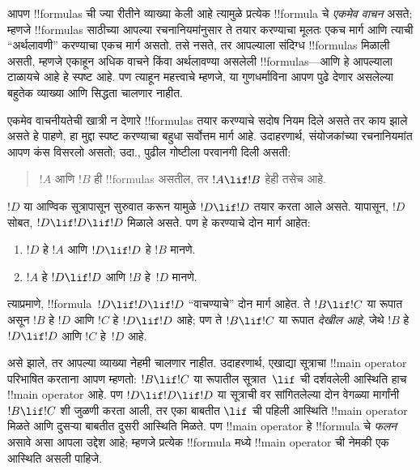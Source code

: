 \documentclass[../../../include/open-logic-section]{subfiles}
\begin{document}


\begin{explain}
आपण !!{formula}s ची ज्या रीतीने व्याख्या केली आहे त्यामुळे प्रत्येक
!!{formula} चे \emph{एकमेव वाचन} असते; म्हणजे !!{formula}s साठीच्या
आपल्या रचनानियमांनुसार ते तयार करण्याचा मूलतः एकच मार्ग आणि त्याची
``अर्थलावणी'' करण्याचा एकच मार्ग असतो. तसे नसते, तर आपल्याला संदिग्ध
!!{formula}s मिळाली असती, म्हणजे एकाहून अधिक वाचने किंवा अर्थलावण्या
असलेली !!{formula}s---आणि हे आपल्याला टाळायचे आहे हे स्पष्ट आहे. पण
त्याहून महत्त्वाचे म्हणजे, या गुणधर्माविना आपण पुढे देणार असलेल्या
बहुतेक व्याख्या आणि सिद्धता चालणार नाहीत.

एकमेव वाचनीयतेची खात्री न देणारे !!{formula}s तयार करण्याचे सदोष नियम
दिले असते तर काय झाले असते हे पाहणे, हा मुद्दा स्पष्ट करण्याचा बहुधा
सर्वोत्तम मार्ग आहे. उदाहरणार्थ, संयोजकांच्या रचनानियमांत आपण कंस
विसरलो असतो; उदा., पुढील गोष्टीला परवानगी दिली असती:
\begin{quote}
$!A$ आणि $!B$ ही !!{formula}s असतील, तर $!A \lif !B$ हेही तसेच आहे.
\end{quote}
$!D$ या आण्विक सूत्रापासून सुरुवात करून यामुळे $!D \lif !D$ तयार करता
आले असते. यापासून, $!D$ सोबत, $!D \lif !D \lif !D$ मिळाले असते. पण
हे करण्याचे दोन मार्ग आहेत:
\begin{enumerate}
\item $!D$ हे $!A$ आणि $!D \lif !D$ हे $!B$ मानणे.
\item $!A$ हे $!D \lif !D$ आणि $!B$ हे~$!D$ मानणे.
\end{enumerate}
त्याप्रमाणे, !!{formula}~$!D \lif !D \lif !D$ ``वाचण्याचे'' दोन मार्ग
आहेत. ते $!B \lif !C$ या रूपात असून $!B$ हे $!D$ आणि $!C$ हे $!D
\lif !D$ आहे; पण ते $!B \lif !C$ या रूपात \emph{देखील आहे}, जेथे $!B$
हे $!D \lif !D$ आणि $!C$ हे~$!D$ आहे.

असे झाले, तर आपल्या व्याख्या नेहमी चालणार नाहीत. उदाहरणार्थ, एखाद्या
सूत्राचा !!{main operator} परिभाषित करताना आपण म्हणतो: $!B \lif !C$
या रूपातील सूत्रात~$\lif$ ची दर्शवलेली आस्थिति हाच !!{main operator}
आहे. पण $!D \lif !D \lif !D$ या सूत्राची वर सांगितलेल्या दोन वेगळ्या
मार्गांनी $!B \lif !C$ शी जुळणी करता आली, तर एका बाबतीत $\lif$ ची
पहिली आस्थिति !!{main operator} मिळते आणि दुसऱ्या बाबतीत दुसरी
आस्थिति मिळते. पण !!{main operator} हे !!{formula} चे \emph{फलन} असावे
असा आपला उद्देश आहे; म्हणजे प्रत्येक !!{formula} मध्ये !!{main
  operator} ची नेमकी एक आस्थिति असली पाहिजे.
\end{explain}
\end{document}
